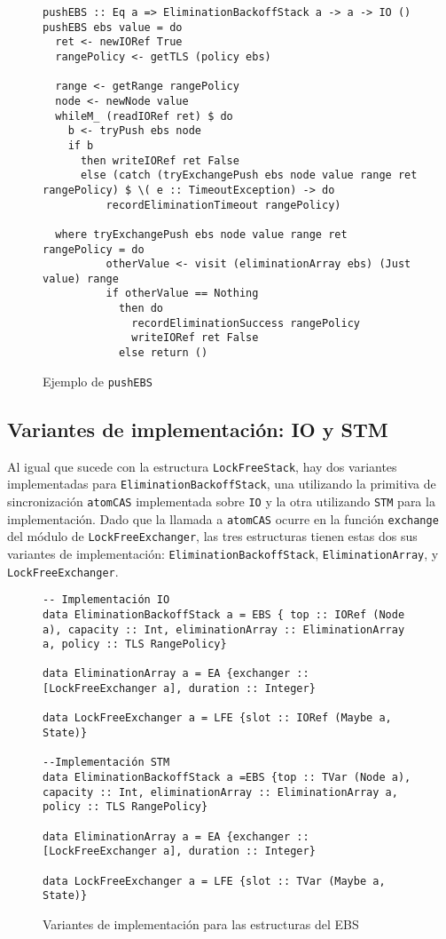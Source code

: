 \begin{figure}[H]
\begin{verbatim}
pushEBS :: Eq a => EliminationBackoffStack a -> a -> IO ()
pushEBS ebs value = do
  ret <- newIORef True
  rangePolicy <- getTLS (policy ebs)

  range <- getRange rangePolicy
  node <- newNode value
  whileM_ (readIORef ret) $ do
    b <- tryPush ebs node
    if b
      then writeIORef ret False
      else (catch (tryExchangePush ebs node value range ret rangePolicy) $ \( e :: TimeoutException) -> do
          recordEliminationTimeout rangePolicy)

  where tryExchangePush ebs node value range ret rangePolicy = do
          otherValue <- visit (eliminationArray ebs) (Just value) range
          if otherValue == Nothing
            then do
              recordEliminationSuccess rangePolicy
              writeIORef ret False
            else return ()
\end{verbatim}
\caption{Ejemplo de \texttt{pushEBS}}
\end{figure}

\clearpage
\subsection{Variantes de implementación: IO y STM}
Al igual que sucede con la estructura \texttt{LockFreeStack}, hay dos variantes implementadas para \texttt{EliminationBackoffStack}, una utilizando la primitiva de sincronización \texttt{atomCAS} implementada sobre \texttt{IO} y la otra utilizando \texttt{STM} para la implementación.
Dado que la llamada a \texttt{atomCAS} ocurre en la función \texttt{exchange} del módulo de \texttt{LockFreeExchanger}, las tres estructuras tienen estas dos sus variantes de implementación: \texttt{EliminationBackoffStack}, \texttt{EliminationArray}, y \texttt{LockFreeExchanger}.

\begin{figure}[H]
\begin{verbatim}
-- Implementación IO
data EliminationBackoffStack a = EBS { top :: IORef (Node a), capacity :: Int, eliminationArray :: EliminationArray a, policy :: TLS RangePolicy}

data EliminationArray a = EA {exchanger :: [LockFreeExchanger a], duration :: Integer}

data LockFreeExchanger a = LFE {slot :: IORef (Maybe a, State)}

--Implementación STM
data EliminationBackoffStack a =EBS {top :: TVar (Node a), capacity :: Int, eliminationArray :: EliminationArray a, policy :: TLS RangePolicy}

data EliminationArray a = EA {exchanger :: [LockFreeExchanger a], duration :: Integer}

data LockFreeExchanger a = LFE {slot :: TVar (Maybe a, State)}
\end{verbatim}
\caption{Variantes de implementación para las estructuras del EBS}
\end{figure}

